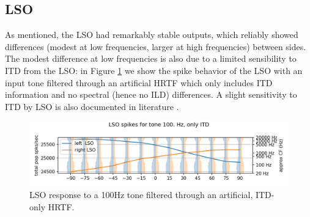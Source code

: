 \documentclass[11pt,a4paper]{article}
\begin{document}
\subsection{LSO}
As mentioned, the LSO had remarkably stable outputs, which reliably showed differences (modest at low frequencies, larger at high frequencies) between sides. The modest difference at low frequencies is also due to a limited sensibility to ITD from the LSO: in Figure \ref{fig:lso-itdonly} we show the spike behavior of the LSO with an input tone filtered through an artificial HRTF which only includes ITD information and no spectral (hence no ILD) differences. A slight sensitivity to ITD by LSO is also documented in literature \cite{yinNeuralMechanismsBinaural2019}.
\begin{figure}[H]
    \centering
    \includegraphics[width=0.75\linewidth]{Images/LSOonlyITD.png}
    \caption{LSO response to a 100Hz tone filtered through an artificial, ITD-only HRTF.}
    \label{fig:lso-itdonly}
\end{figure}
\end{document}
